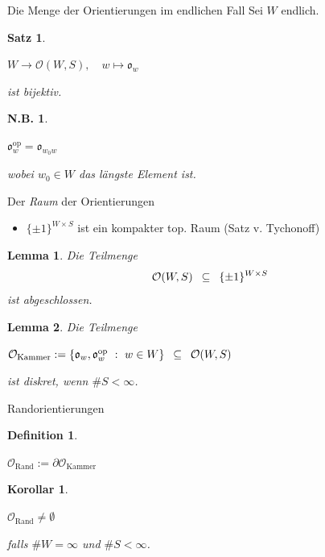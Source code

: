 \documentclass[pdf]{beamer}
\newcommand{\op}[1]{\operatorname{#1}}
\newtheorem*{satz*}{Satz}
\newtheorem*{cor*}{Korollar}
\newtheorem*{lemma*}{Lemma}
\newtheorem*{nb*}{N.B.}
\newtheorem*{def*}{Definition}
\begin{document}
\begin{frame}{Die Menge der Orientierungen im endlichen Fall}
   Sei $W$ endlich.
   \pause\begin{satz*}
      \begin{center}$W \longrightarrow \mathcal{O}(W,S),\quad w \mapsto \mathfrak{o}_{w}$\end{center}
      ist bijektiv.
   \end{satz*}
   \pause\begin{nb*}
      \begin{center}$\mathfrak{o}_{w}^{\op{op}} = \mathfrak{o}_{w_0 w}$\end{center}
      wobei $w_0 \in W$ das längste Element ist.
   \end{nb*}
\end{frame}

\begin{frame}{Der \textit{Raum} der Orientierungen}
   \begin{itemize}
      \item<2-> $\{ \pm 1\}^{W \times S}$ ist ein kompakter top. Raum (Satz v. Tychonoff)
   \end{itemize}
   \pause[3]\begin{lemma*}
      Die Teilmenge
      \[ \mathcal{O}(W,S)\enskip \subseteq\enskip \{ \pm 1 \}^{W \times S} \]
      ist \textit{abgeschlossen}.
   \end{lemma*}
   \pause \begin{lemma*}
      Die Teilmenge
      \begin{center}$\mathcal{O}_{\text{Kammer}} := \{ \mathfrak{o}_w, \mathfrak{o}_w^{\op{op}}\ :\ w \in W\}\enskip \subseteq\enskip \mathcal{O}(W,S)$\end{center}
      ist \textit{diskret}, wenn $\# S < \infty$.
   \end{lemma*}
\end{frame}

\begin{frame}{Randorientierungen}
   \begin{def*}
      \begin{center}$\mathcal{O}_{\text{Rand}} := \partial \mathcal{O}_{\op{Kammer}}$\end{center}
   \end{def*}
   \pause\begin{cor*}
      \begin{center}$\mathcal{O}_{\text{Rand}} \neq \emptyset$\end{center}
      falls $\# W = \infty$ und $\# S < \infty$.
   \end{cor*}
\end{frame}
\end{document}
